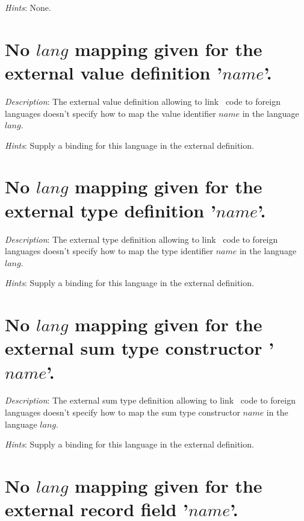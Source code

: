 {\em Hints}: None.



\section*{No $lang$ mapping given for the external value definition
  '$name$'.}

{\em Description}: The external value definition allowing to link
\focal\ code to foreign languages doesn't specify how to map the value
identifier $name$ in the language $lang$.

{\em Hints}: Supply a binding for this language in the external
definition.



\section*{No $lang$ mapping given for the external type definition
  '$name$'.}

{\em Description}: The external type definition allowing to link
\focal\ code to foreign languages doesn't specify how to map the type
identifier $name$ in the language $lang$.

{\em Hints}: Supply a binding for this language in the external
definition.



\section*{No $lang$ mapping given for the external sum type
  constructor '$name$'.}

{\em Description}: The external sum type definition allowing to link
\focal\ code to foreign languages doesn't specify how to map the sum
type constructor $name$ in the language $lang$.

{\em Hints}: Supply a binding for this language in the external
definition.



\section*{No $lang$ mapping given for the external record field
  '$name$'.}


